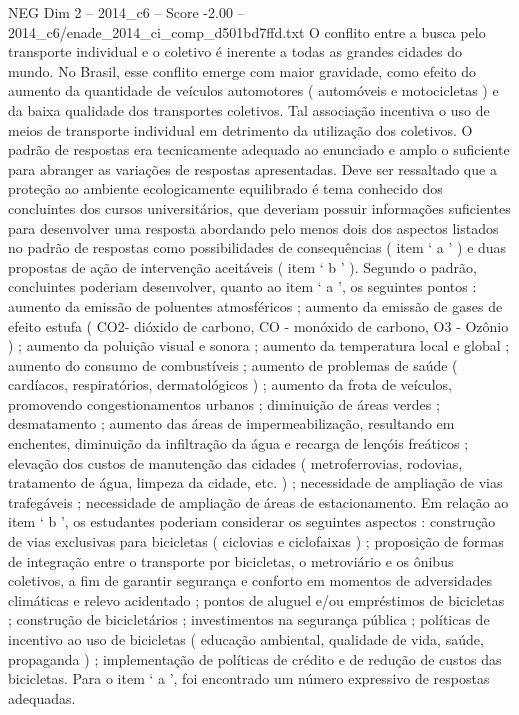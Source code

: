 \begin{textsample}{NEG Dim 2 – 2014\_c6 – Score -2.00 – 2014\_c6/enade\_2014\_ci\_comp\_d501bd7ffd.txt}
O conflito entre a busca pelo transporte individual e o coletivo é inerente a todas as grandes cidades do mundo.
No Brasil, esse conflito emerge com maior gravidade, como efeito do aumento da quantidade de veículos automotores ( automóveis e motocicletas ) e da baixa qualidade dos transportes coletivos.
Tal associação incentiva o uso de meios de transporte individual em detrimento da utilização dos coletivos.
O padrão de respostas era tecnicamente adequado ao enunciado e amplo o suficiente para abranger as variações de respostas apresentadas.
Deve ser ressaltado que a proteção ao ambiente ecologicamente equilibrado é tema conhecido dos concluintes dos cursos universitários, que deveriam possuir informações suficientes para desenvolver uma resposta abordando pelo menos dois dos aspectos listados no padrão de respostas como possibilidades de consequências ( item ‘ a ’ ) e duas propostas de ação de intervenção aceitáveis ( item ‘ b ’ ).
Segundo o padrão, concluintes poderiam desenvolver, quanto ao item ‘ a ’, os seguintes pontos : aumento da emissão de poluentes atmosféricos ; aumento da emissão de gases de efeito estufa ( CO2- dióxido de carbono, CO - monóxido de carbono, O3 - Ozônio ) ; aumento da poluição visual e sonora ; aumento da temperatura local e global ; aumento do consumo de combustíveis ; aumento de problemas de saúde ( cardíacos, respiratórios, dermatológicos ) ; aumento da frota de veículos, promovendo congestionamentos urbanos ; diminuição de áreas verdes ; desmatamento ; aumento das áreas de impermeabilização, resultando em enchentes, diminuição da infiltração da água e recarga de lençóis freáticos ; elevação dos custos de manutenção das cidades ( metroferrovias, rodovias, tratamento de água, limpeza da cidade, etc. ) ; necessidade de ampliação de vias trafegáveis ; necessidade de ampliação de áreas de estacionamento.
Em relação ao item ‘ b ’, os estudantes poderiam considerar os seguintes aspectos : construção de vias exclusivas para bicicletas ( ciclovias e ciclofaixas ) ; proposição de formas de integração entre o transporte por bicicletas, o metroviário e os ônibus coletivos, a fim de garantir segurança e conforto em momentos de adversidades climáticas e relevo acidentado ; pontos de aluguel e/ou empréstimos de bicicletas ; construção de bicicletários ; investimentos na segurança pública ; políticas de incentivo ao uso de bicicletas ( educação ambiental, qualidade de vida, saúde, propaganda ) ; implementação de políticas de crédito e de redução de custos das bicicletas.
Para o item ‘ a ’, foi encontrado um número expressivo de respostas adequadas.

\end{textsample}
